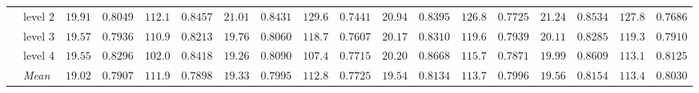 \begin{table}[htbp]
\begin{tabular}{llrrrrrrrrrrrrrrrr}
 & level 2 & {\boldmath$19.91$} & {\boldmath$0.8049$} & {\boldmath$112.1$} & {\boldmath$0.8457$} & $21.01$ & $0.8431$ & $129.6$ & $0.7441$ & $20.94$ & $0.8395$ & $126.8$ & $0.7725$ & $21.24$ & $0.8534$ & $127.8$ & $0.7686$ \\
 & level 3 & {\boldmath$19.57$} & {\boldmath$0.7936$} & {\boldmath$110.9$} & {\boldmath$0.8213$} & $19.76$ & $0.8060$ & $118.7$ & $0.7607$ & $20.17$ & $0.8310$ & $119.6$ & $0.7939$ & $20.11$ & $0.8285$ & $119.3$ & $0.7910$ \\
 & level 4 & $19.55$ & $0.8296$ & {\boldmath$102.0$} & {\boldmath$0.8418$} & {\boldmath$19.26$} & {\boldmath$0.8090$} & $107.4$ & $0.7715$ & $20.20$ & $0.8668$ & $115.7$ & $0.7871$ & $19.99$ & $0.8609$ & $113.1$ & $0.8125$ \\
 & \textit{Mean} & \colorbox{green!20}{\boldmath$19.02$} & \colorbox{green!20}{\boldmath$0.7907$} & \colorbox{green!20}{\boldmath$111.9$} & $0.7898$ & $19.33$ & $0.7995$ & $112.8$ & $0.7725$ & $19.54$ & $0.8134$ & $113.7$ & $0.7996$ & $19.56$ & $0.8154$ & $113.4$ & \colorbox{green!20}{\boldmath$0.8030$} \\
\bottomrule
\end{tabular}
\end{table}
